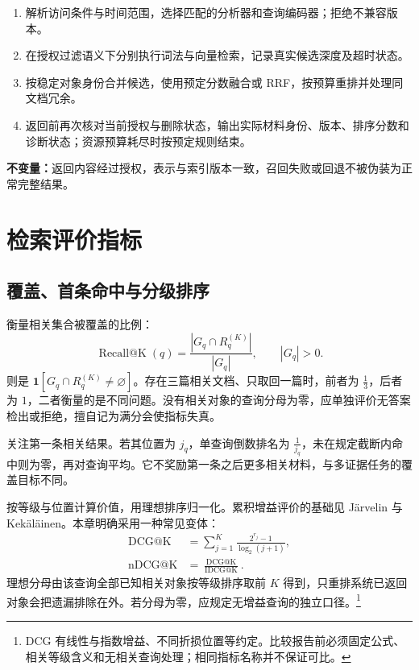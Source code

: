 \documentclass[../textbook.tex]{subfiles}
\begin{document}
\begin{algorithm}[具有版本边界的混合检索]
\begin{enumerate}
\item 解析访问条件与时间范围，选择匹配的分析器和查询编码器；拒绝不兼容版本。
\item 在授权过滤语义下分别执行词法与向量检索，记录真实候选深度及超时状态。
\item 按稳定对象身份合并候选，使用预定分数融合或 RRF，按预算重排并处理同文档冗余。
\item 返回前再次核对当前授权与删除状态，输出实际材料身份、版本、排序分数和诊断状态；资源预算耗尽时按预定规则结束。
\end{enumerate}
\textbf{不变量：}返回内容经过授权，表示与索引版本一致，召回失败或回退不被伪装为正常完整结果。
\end{algorithm}

\section{检索评价指标}

\subsection{覆盖、首条命中与分级排序}
衡量相关集合被覆盖的比例：
\begin{equation}
\operatorname{Recall@K}(q)=\frac{|G_q\cap R_q^{(K)}|}{|G_q|},\qquad |G_q|>0.
\end{equation}
则是 $\mathbf1[G_q\cap R_q^{(K)}\ne\varnothing]$。存在三篇相关文档、只取回一篇时，前者为 $\frac{1}{3}$，后者为 $1$，二者衡量的是不同问题。没有相关对象的查询分母为零，应单独评价无答案检出或拒绝，擅自记为满分会使指标失真。

关注第一条相关结果。若其位置为 $j_q$，单查询倒数排名为 $\frac{1}{j_q}$，未在规定截断内命中则为零，再对查询平均。它不奖励第一条之后更多相关材料，与多证据任务的覆盖目标不同。

按等级与位置计算价值，用理想排序归一化。累积增益评价的基础见 Järvelin 与 Kekäläinen\cite{jarvelin2002dcg}。本章明确采用一种常见变体：
\begin{equation}
 \begin{aligned}
  \operatorname{DCG@K} &= \sum_{j=1}^{K}\frac{2^{r_j}-1}{\log_2(j+1)}, \\
  \operatorname{nDCG@K} &= \frac{\operatorname{DCG@K}}{\operatorname{IDCG@K}}.
 \end{aligned}
\end{equation}
理想分母由该查询全部已知相关对象按等级排序取前 $K$ 得到，只重排系统已返回对象会把遗漏排除在外。若分母为零，应规定无增益查询的独立口径。\footnote{DCG 有线性与指数增益、不同折损位置等约定。比较报告前必须固定公式、相关等级含义和无相关查询处理；相同指标名称并不保证可比。}
\end{document}
